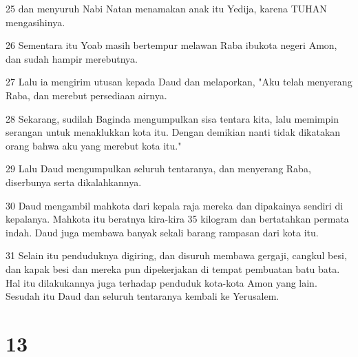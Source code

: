 \par 25 dan menyuruh Nabi Natan menamakan anak itu Yedija, karena TUHAN mengasihinya.
\par 26 Sementara itu Yoab masih bertempur melawan Raba ibukota negeri Amon, dan sudah hampir merebutnya.
\par 27 Lalu ia mengirim utusan kepada Daud dan melaporkan, "Aku telah menyerang Raba, dan merebut persediaan airnya.
\par 28 Sekarang, sudilah Baginda mengumpulkan sisa tentara kita, lalu memimpin serangan untuk menaklukkan kota itu. Dengan demikian nanti tidak dikatakan orang bahwa aku yang merebut kota itu."
\par 29 Lalu Daud mengumpulkan seluruh tentaranya, dan menyerang Raba, diserbunya serta dikalahkannya.
\par 30 Daud mengambil mahkota dari kepala raja mereka dan dipakainya sendiri di kepalanya. Mahkota itu beratnya kira-kira 35 kilogram dan bertatahkan permata indah. Daud juga membawa banyak sekali barang rampasan dari kota itu.
\par 31 Selain itu penduduknya digiring, dan disuruh membawa gergaji, cangkul besi, dan kapak besi dan mereka pun dipekerjakan di tempat pembuatan batu bata. Hal itu dilakukannya juga terhadap penduduk kota-kota Amon yang lain. Sesudah itu Daud dan seluruh tentaranya kembali ke Yerusalem.

\chapter{13}

